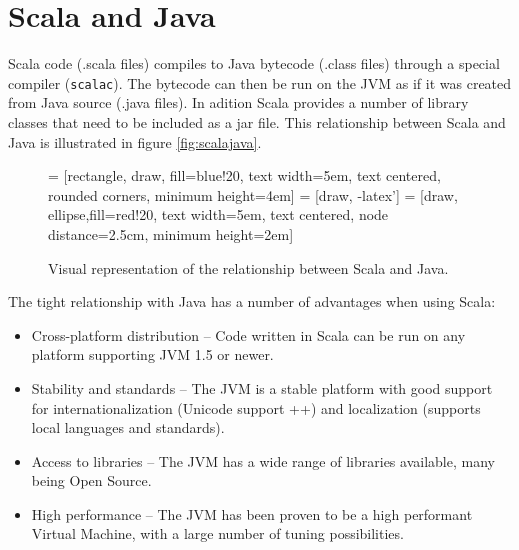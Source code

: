 \documentclass[a4paper,english]{report}
\begin{document}
\section{Scala and Java}

Scala code (.scala files) compiles to Java bytecode (.class files)
through a special compiler (\texttt{scalac}). The bytecode can then be
run on the JVM as if it was created from Java source (.java files). In
adition Scala provides a number of library classes that need to be
included as a jar file. This relationship between Scala and Java is
illustrated in figure \vref{fig:scalajava}.

\begin{figure}
  \begin{center}
   = [rectangle, draw, fill=blue!20, text width=5em, text centered, rounded corners, minimum height=4em]
   = [draw, -latex']
   = [draw, ellipse,fill=red!20, text width=5em, text centered, node distance=2.5cm, minimum height=2em]
  \end{center}
  \caption{Visual representation of the relationship between Scala and
    Java.\label{fig:scalajava}}
\end{figure}

The tight relationship with Java has a number of advantages when using
Scala:

\begin{itemize}
\item Cross-platform distribution -- Code written in Scala can be run
  on any platform supporting JVM 1.5 or newer.
\item Stability and standards -- The JVM is a stable platform with
  good support for internationalization (Unicode support ++) and
  localization (supports local languages and standards).
\item Access to libraries -- The JVM has a wide range of libraries
  available, many being Open Source.
\item High performance -- The JVM has been proven to be a high
  performant Virtual Machine, with a large number of tuning
  possibilities.
\end{itemize}
\end{document}
